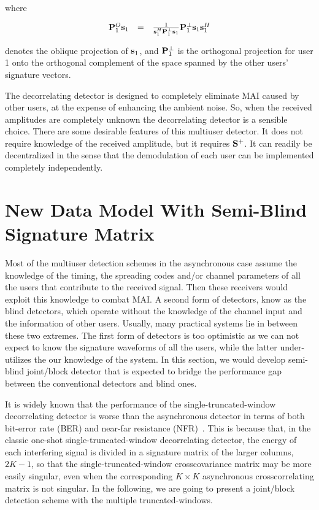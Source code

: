 \documentclass[a4paper,11pt,fleqn]{article}
\newcommand{\bs}{{\bf s}}
\newcommand{\bS}{{\bf S}}
\newcommand{\bP}{{\bf P}}
\begin{document}
\noindent where

\begin{equation}
\begin{array}{rcl}
\bP_1^{O}\bs_1&=&{1 \over \bs_1^H\bP_1^{\perp}\bs_1
}\bP_1^{\perp}\bs_1\bs_1^H
\end{array}
\end{equation}

\noindent denotes the oblique projection of $\bs_1$, and
$\bP_1^{\perp}$ is the orthogonal projection for user 1 onto the
orthogonal complement of the space spanned by the other users'
signature vectors.

The decorrelating detector is designed to completely eliminate MAI
caused by other users, at the expense of enhancing the ambient
noise. So, when the received amplitudes are completely unknown the
decorrelating detector is a sensible choice. There are some
desirable features of this multiuser detector. It does not require
knowledge of the received amplitude, but it requires $\bS^+$. It
can readily be decentralized in the sense that the demodulation of
each user can be implemented completely independently.


\section{New Data Model With Semi-Blind Signature Matrix}

Most of the multiuser detection schemes in the asynchronous case
assume the knowledge of the timing, the spreading codes and/or
channel parameters of all the users that contribute to the
received signal. Then these receivers would exploit this knowledge
to combat MAI. A second form of detectors, know as the blind
detectors, which operate without the knowledge of the channel
input and the information of other users. Usually, many practical
systems lie in between these two extremes. The first form of
detectors is too optimistic as we can not expect to know the
signature waveforms of all the users, while the latter
under-utilizes the our knowledge of the system. In this section,
we would develop semi-blind joint/block detector that is expected
to bridge the performance gap between the conventional detectors
and blind ones.

It is widely known that the performance of the
single-truncated-window decorrelating detector is worse than the
asynchronous detector in terms of both bit-error rate (BER) and
near-far resistance (NFR)~\cite{Verd98}. This is because that, in
the classic one-shot single-truncated-window decorrelating
detector, the energy of each interfering signal is divided in a
signature matrix of the larger columns, $2K-1$, so that the
single-truncated-window crosscovariance matrix may be more easily
singular, even when the corresponding $K\times K$ asynchronous
crosscorrelating matrix is not singular. In the following, we are
going to present a joint/block detection scheme with the multiple
truncated-windows.
\end{document}
